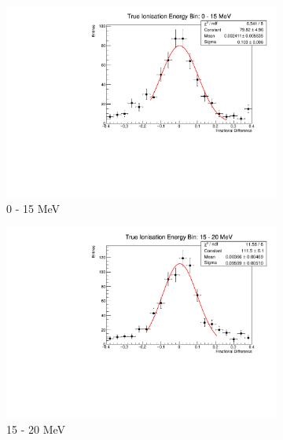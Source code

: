 \begin{figure}

	\centering
	\begin{subfigure}[b]{0.49\textwidth}
		\centering
		\includegraphics[width=\textwidth]{figures/ion_res_0.pdf}
		\caption {0 - 15 MeV}
	\end{subfigure}
	\hfill
	\begin{subfigure}[b]{0.49\textwidth}
		\centering
		\includegraphics[width=\textwidth]{figures/ion_res_15.pdf}
		\caption {15 - 20 MeV}
	\end{subfigure}
	\begin{subfigure}[b]{0.49\textwidth}
		\centering
		\vspace{5mm}

\end{subfigure}
\end{figure}
